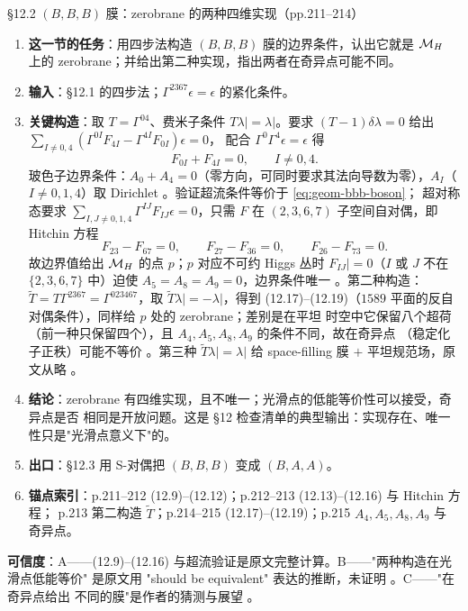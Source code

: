 \begin{kcard}{\S12.2 $(B,B,B)$ 膜：zerobrane 的两种四维实现（pp.211--214）}
\begin{enumerate}[label=\textbf{\arabic*}]
\item \textbf{这一节的任务}：用四步法构造 $(B,B,B)$ 膜的边界条件，认出它就是 $\mathcal{M}_H$ 上的
  zerobrane；并给出第二种实现，指出两者在奇异点可能不同。
\item \textbf{输入}：\S12.1 的四步法；$\Gamma^{2367}\epsilon=\epsilon$ 的紧化条件。
\item \textbf{关键构造}：取 $T=\Gamma^{04}$、费米子条件 $T\lambda|=\lambda|$。要求
  $(T-1)\delta\lambda=0$ 给出 $\sum_{I\neq0,4}(\Gamma^{0I}F_{4I}-\Gamma^{4I}F_{0I})\epsilon=0$，
  配合 $\Gamma^0\Gamma^4\epsilon=\epsilon$ 得
\begin{equation}
F_{0I}+F_{4I}=0,\qquad I\neq0,4 .
\label{eq:geom-bbb-boson}
\end{equation}
  玻色子边界条件：$A_0+A_4=0$（零方向，可同时要求其法向导数为零），$A_I$（$I\neq0,1,4$）取
  Dirichlet \pA{}。验证超流条件等价于 \eqref{eq:geom-bbb-boson}；
  超对称态要求 $\sum_{I,J\neq0,1,4}\Gamma^{IJ}F_{IJ}\epsilon=0$，只需 $F$ 在
  $(2,3,6,7)$ 子空间自对偶，即 Hitchin 方程
\begin{equation}
F_{23}-F_{67}=0,\qquad F_{27}-F_{36}=0,\qquad F_{26}-F_{73}=0 .
\label{eq:geom-hitchin-boundary}
\end{equation}
  故边界值给出 $\mathcal{M}_H$ 的点 $p$；$p$ 对应不可约 Higgs 丛时 $F_{IJ}|=0$（$I$ 或 $J$ 不在
  $\{2,3,6,7\}$ 中）迫使 $A_5=A_8=A_9=0$，边界条件唯一 \pA{}。第二种构造：
  $\widetilde T=T\Gamma^{2367}=\Gamma^{023467}$，取 $\widetilde T\lambda|=-\lambda|$，得到
  (12.17)--(12.19)（$1589$ 平面的反自对偶条件），同样给 $p$ 处的 zerobrane；差别是在平坦
  时空中它保留八个超荷（前一种只保留四个），且 $A_4,A_5,A_8,A_9$ 的条件不同，故在奇异点
  （稳定化子正秩）可能不等价 \pA{}。第三种
  $\widetilde T\lambda|=\lambda|$ 给 space-filling 膜 $+$ 平坦规范场，原文从略
  \pA{}。
\item \textbf{结论}：zerobrane 有四维实现，且不唯一；光滑点的低能等价性可以接受，奇异点是否
  相同是开放问题。这是 \S12 检查清单的典型输出：实现存在、唯一性只是"光滑点意义下"的。
\item \textbf{出口}：\S12.3 用 S-对偶把 $(B,B,B)$ 变成 $(B,A,A)$。
\item \textbf{锚点索引}：p.211--212 (12.9)--(12.12)；p.212--213 (12.13)--(12.16) 与 Hitchin 方程；
  p.213 第二构造 $\widetilde T$；p.214--215 (12.17)--(12.19)；p.215 $A_4,A_5,A_8,A_9$ 与
  奇异点。
\end{enumerate}
\textbf{可信度}：A——(12.9)--(12.16) 与超流验证是原文完整计算。B——"两种构造在光滑点低能等价"
是原文用 "should be equivalent" 表达的推断，未证明 \pB{}。C——"在奇异点给出
不同的膜"是作者的猜测与展望 \pC{}。
\end{kcard}

